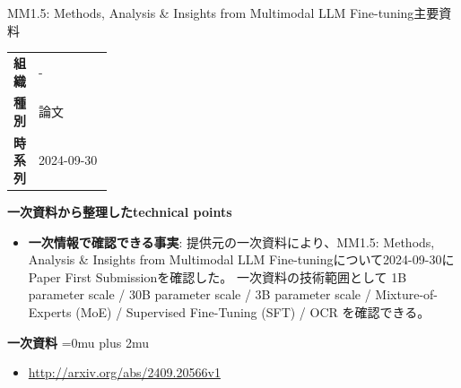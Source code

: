\begin{technicalnote}{MM1.5: Methods, Analysis \& Insights from Multimodal LLM Fine-tuning}{主要資料}
\begingroup
\begin{tabularx}{\linewidth}{@{}>{\bfseries}p{0.22\linewidth}X@{}}
組織 & - \\
種別 & 論文 \\
時系列 & 2024-09-30 \\
\end{tabularx}
\smallskip
{\bfseries 一次資料から整理したtechnical points}
\begin{itemize}[leftmargin=1.5em,itemsep=0.35em]
\item \textbf{一次情報で確認できる事実}: 提供元の一次資料により、MM1.5: Methods, Analysis \& Insights from Multimodal LLM Fine-tuningについて2024-09-30にPaper First Submissionを確認した。 一次資料の技術範囲として 1B parameter scale / 30B parameter scale / 3B parameter scale / Mixture-of-Experts (MoE) / Supervised Fine-Tuning (SFT) / OCR を確認できる。
\end{itemize}
\begin{minipage}{\linewidth}
\begin{samepage}
{\bfseries 一次資料}
\begingroup\sloppy
\Urlmuskip=0mu plus 2mu\relax
\begin{itemize}[leftmargin=1.5em,itemsep=0.25em]
\item {\scriptsize\url{http://arxiv.org/abs/2409.20566v1}}
\end{itemize}
\endgroup
\end{samepage}
\end{minipage}
\endgroup
\end{technicalnote}
\medskip

